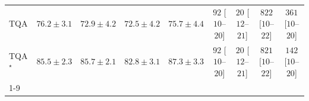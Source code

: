 \begin{tabular}{l|cccc|cccc|}
TQA & {\cellcolor[HTML]{2685BB}} \color[HTML]{F1F1F1} $76.2\pm 3.1$ & {\cellcolor[HTML]{509AC6}} \color[HTML]{F1F1F1} $72.9\pm 4.2$ & {\cellcolor[HTML]{569DC8}} \color[HTML]{F1F1F1} $72.5\pm 4.2$ & {\cellcolor[HTML]{2C89BD}} \color[HTML]{F1F1F1} $75.7\pm 4.4$ & {\cellcolor[HTML]{FDE4E1}} \color[HTML]{000000} $92$ [$10$--$20$] & {\cellcolor[HTML]{FFF4F0}} \color[HTML]{000000} $20$ [$12$--$21$] & {\cellcolor[HTML]{4B006A}} \color[HTML]{F1F1F1} $822$ [$10$--$22$] & {\cellcolor[HTML]{F986AC}} \color[HTML]{F1F1F1} $361$ [$10$--$20$] \\
TQA$^\star$ & {\cellcolor[HTML]{034B76}} \color[HTML]{F1F1F1} $85.5\pm 2.3$ & {\cellcolor[HTML]{034A74}} \color[HTML]{F1F1F1} $85.7\pm 2.1$ & {\cellcolor[HTML]{045E94}} \color[HTML]{F1F1F1} $82.8\pm 3.1$ & {\cellcolor[HTML]{023D60}} \color[HTML]{F1F1F1} $87.3\pm 3.3$ & {\cellcolor[HTML]{FDE4E1}} \color[HTML]{000000} $92$ [$10$--$20$] & {\cellcolor[HTML]{FFF4F0}} \color[HTML]{000000} $20$ [$12$--$21$] & {\cellcolor[HTML]{4C006B}} \color[HTML]{F1F1F1} $821$ [$10$--$22$] & {\cellcolor[HTML]{FDD7D4}} \color[HTML]{000000} $142$ [$10$--$20$] \\
\cline{1-9}
\bottomrule
\end{tabular}

